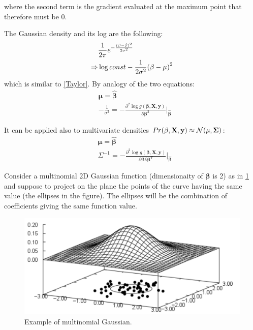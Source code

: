 \documentclass[12pt, letterpaper]{article}
\theoremstyle{definition}
\newcommand{\X}{\mathrm{\mathbf{X}}}
\newcommand{\y}{\mathbf{y}}
\newcommand{\be}{\mathbf{\beta}}
\newcommand{\hbe}{\hat{\mathbf{\beta}}}
\DeclarePairedDelimiter\autobracket{(}{)}
\newcommand{\br}[1]{\autobracket*{#1}}
\begin{document}
where the second term is the gradient evaluated at the maximum point that therefore must be $0$.

The Gaussian density and its log are the following:
\begin{equation}
\begin{aligned}
&\frac{1}{2\pi}e^{-\frac{(\be-\hbe)^2}{2\sigma^2}}\\
\Rightarrow &\log const -\frac{1}{2\sigma^2}\br{\be-\mu}^2
\end{aligned}
\end{equation}
which is similar to \ref{Taylor}. By analogy of the two equations:
\begin{equation}
\begin{aligned}
&\mathbf{\mu} = \hbe\\
&-\frac{1}{\sigma^2} = -\frac{ \partial^2 \log g(\be,\X,\y)}{\partial \be^2}\bigg\rvert_{\hbe}
\end{aligned}
\end{equation}

It can be applied also to multivariate densities  $Pr(\be,\X,\y) \approx \CMcal{N}(\mathbf{\mu, \Sigma})$:
\begin{equation}
\begin{aligned}
&\mathbf{\mu} = \hbe\\
&\Sigma^{-1} = -\frac{ \partial^2 \log g(\be,\X,\y)}{\partial \be\partial\be^T}\bigg\rvert_{\hbe}
\end{aligned}
\end{equation}

Consider a multinomial 2D Gaussian function (dimensionaity of $\be$ is 2) as in \ref{gaussianfig} and suppose to project on the plane the points of the curve having the same value (the ellipses in the figure). The ellipses will be the combination of coefficients giving the same function value.
\begin{figure}
\centering
\includegraphics[scale=0.4]{img/gaussian}
\caption{Example of multinomial Gaussian.}
\label{gaussianfig}
\end{figure}
\end{document}
